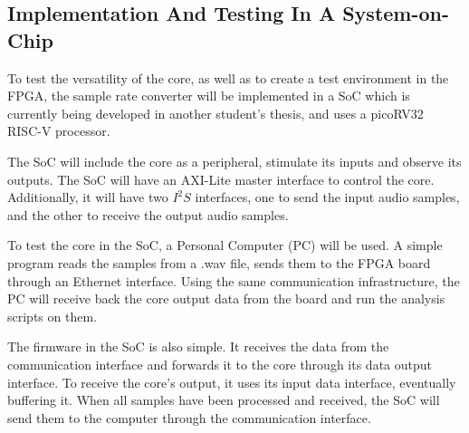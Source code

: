 \subsection{Implementation And Testing In A System-on-Chip}
\label{section:SoC}

To test the versatility of the core, as well as to create a test environment in
the FPGA, the sample rate converter will be implemented in a SoC which is
currently being developed in another student's thesis, and uses a
picoRV32~\cite{picorv32} RISC-V processor.

The SoC will include the core as a peripheral, stimulate its inputs and observe
its outputs. The SoC will have an AXI-Lite master interface to control the
core. Additionally, it will have two $I^2S$ interfaces, one to send the input
audio samples, and the other to receive the output audio samples.

To test the core in the SoC, a Personal Computer (PC) will be used. A simple
program reads the samples from a .wav file, sends them to the FPGA board through
an Ethernet interface. Using the same communication infrastructure, the PC
will receive back the core output data from the board and run the analysis
scripts on them.

The firmware in the SoC is also simple. It receives the data from the
communication interface and forwards it to  the core through its data output interface.
To receive the core's output, it uses its input data interface, eventually buffering it.
When all samples have been processed and received, the SoC will send them to the
computer through the communication interface.
